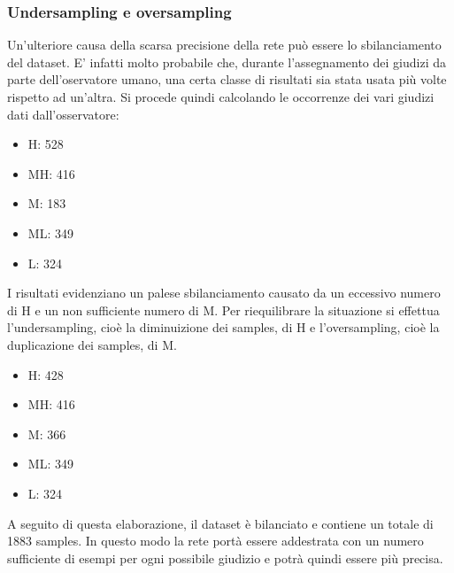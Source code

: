 \documentclass[a4paper,11pt]{article}
\begin{document}
    \subsubsection{Undersampling e oversampling}
    Un'ulteriore causa della scarsa precisione della rete può essere lo sbilanciamento del dataset. E' infatti molto probabile che, durante l'assegnamento dei giudizi da parte dell'oservatore umano, 
    una certa classe di risultati sia stata usata più volte rispetto ad un'altra. Si procede quindi calcolando le occorrenze dei vari giudizi dati dall'osservatore:
    \begin{itemize}
        \item H: 528
        \item MH: 416
        \item M: 183
        \item ML: 349
        \item L: 324
    \end{itemize}
    I risultati evidenziano un palese sbilanciamento causato da un eccessivo numero di H e un non sufficiente numero di M.
    Per riequilibrare la situazione si effettua l'undersampling, cioè la diminuizione dei samples, di H e l'oversampling, cioè la duplicazione dei samples, di M.
    \begin{itemize}
        \item H: 428
        \item MH: 416
        \item M: 366
        \item ML: 349
        \item L: 324
    \end{itemize}
    A seguito di questa elaborazione, il dataset è bilanciato e contiene un totale di 1883 samples.
    In questo modo la rete portà essere addestrata con un numero sufficiente di esempi per ogni possibile giudizio e potrà quindi essere più precisa.
    \newpage
\end{document}
